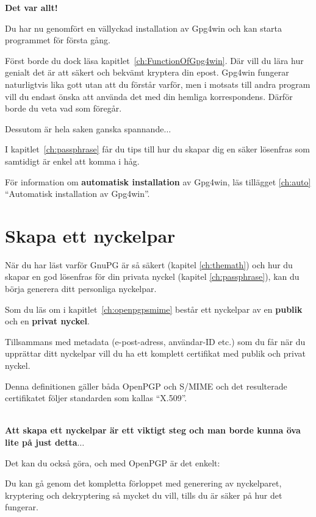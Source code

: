 \documentclass[a4paper,11pt, oneside,openright,titlepage,dvips]{scrbook}
\newcommand\margin[1]{\marginline {\sffamily\scriptsize #1}}
\newcommand{\IncludeImage}[2][]{\texorhtml{%
\texttt{[image: \#2]}%
}{%
\htmlimg{#2.png}%
}}
\newcounter{chapter}
\begin{document}
\clearpage

\textbf{Det var allt!}

Du har nu genomfört en vällyckad installation av Gpg4win och kan starta
programmet för första gång.

Först borde du dock läsa kapitlet~\ref{ch:FunctionOfGpg4win}.
Där vill du lära hur genialt det är att säkert och bekvämt kryptera
din epost. Gpg4win fungerar naturligtvis lika gott utan att du förstår
varför, men i motsats till andra program vill du endast önska att
använda det med din hemliga korrespondens. Därför borde du veta vad
som föregår.

Dessutom är hela saken ganska spannande$\ldots$

I kapitlet~\ref{ch:passphrase} får du tips till
hur du skapar dig en säker lösenfras som samtidigt 
är enkel att komma i håg.

För information om \textbf{automatisk installation} av Gpg4win, läs
tillägget \ref{ch:auto} "`Automatisk installation av Gpg4win"'.


\clearpage
{}
\chapter{Skapa ett nyckelpar}
\label{ch:CreateKeyPair}

När du har läst varför GnuPG är så säkert (kapitel \ref{ch:themath})
och hur du skapar en god lösenfras för din privata nyckel 
(kapitel \ref{ch:passphrase}), kan du börja generera ditt
personliga nyckelpar.

Som du läs om i kapitlet~\ref{ch:openpgpsmime} består ett nyckelpar
av en \textbf{publik} och en  \textbf{privat nyckel}. 

Tillsammans med metadata (e-post-adress, användar-ID etc.) som du får
när du upprättar ditt nyckelpar vill du ha ett komplett certifikat med
publik och privat nyckel.

Denna definitionen gäller båda OpenPGP och S/MIME och det resulterade
certifikatet följer standarden som kallas "`X.509"'.

~\\
\textbf{Att skapa ett nyckelpar är ett viktigt steg
och man borde kunna öva lite på just detta$\ldots$}

Det kan du också göra, och med OpenPGP är det enkelt:

\T\margin{\IncludeImage[width=1.5cm]{openpgp-icon}}
Du kan gå genom det kompletta förloppet med generering av
nyckelparet, kryptering och dekryptering så mycket du vill,
tills du är säker på hur det fungerar.
\end{document}

